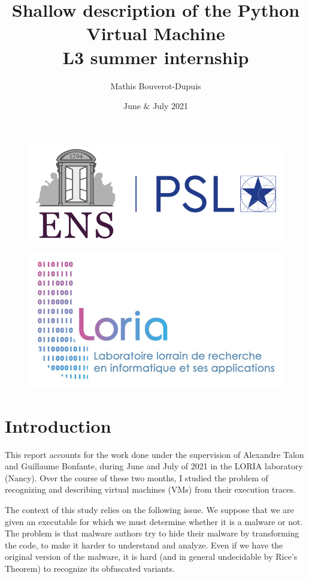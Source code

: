\documentclass[english]{article}
\begin{document}
	
\title{Shallow description of the Python Virtual Machine \\ \large L3 summer internship}
\author{Mathis Bouverot-Dupuis}
\date{June \& July 2021}

\maketitle 

\begin{figure}[h]
	\centering 
	\includegraphics[width=.7\linewidth]{img/logoENS.png}	
\end{figure}
\begin{figure}[h]
	\centering 
	\includegraphics[width=.7\linewidth]{img/logoLORIA.jpg}
\end{figure} 

\newpage 

\tableofcontents
\newpage

\section{Introduction}
This report accounts for the work done under the supervision of Alexandre Talon and Guillaume Bonfante, during June and July of 2021 in the LORIA laboratory (Nancy). Over the course of these two months, I studied the problem of recognizing and describing virtual machines (VMs) from their execution traces.

The context of this study relies on the following issue.
We suppose that we are given an executable for which we must
determine whether it is a malware or not. The problem is that
malware authors try to hide their malware by transforming the code, to make it harder to understand and analyze. Even
if we have the original version of the malware, it is hard (and in general undecidable by Rice's Theorem) to recognize its obfuscated variants.
\end{document}
